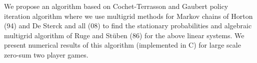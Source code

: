 \documentclass{report}
\begin{document}
We propose an algorithm based on Cochet-Terrasson and Gaubert policy
iteration algorithm where we use multigrid methods for Markov chains of
Horton (94) and De Sterck and all (08) to find the stationary
probabilities and algebraic multigrid algorithm of Ruge and St{\"u}ben
(86) for the above linear systems.
We present numerical results of this algorithm (implemented in C) for
large scale zero-sum two player games.
\end{document}
